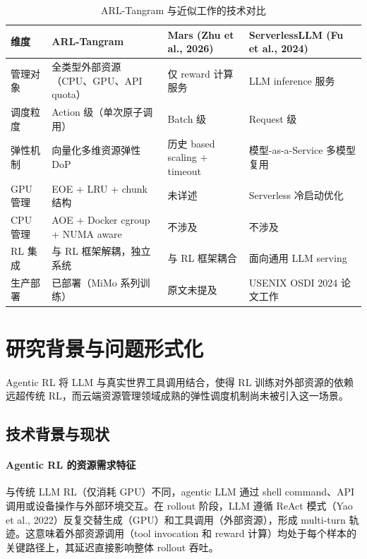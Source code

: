 \documentclass[11pt, a4paper]{article}
\begin{document}
\begin{table}[htbp]
\centering
\caption{ARL-Tangram 与近似工作的技术对比}
\label{tab:comparison}
\begin{tabular}{p{2.8cm}p{3.2cm}p{3.2cm}p{3.2cm}}
\toprule
\textbf{维度} & \textbf{ARL-Tangram} & \textbf{Mars (Zhu et al., 2026)} & \textbf{ServerlessLLM (Fu et al., 2024)} \\
\midrule
管理对象 & 全类型外部资源（CPU、GPU、API quota） & 仅 reward 计算服务 & LLM inference 服务 \\
调度粒度 & Action 级（单次原子调用） & Batch 级 & Request 级 \\
弹性机制 & 向量化多维资源弹性 DoP & 历史 based scaling + timeout & 模型-as-a-Service 多模型复用 \\
GPU 管理 & EOE + LRU + chunk 结构 & 未详述 & Serverless 冷启动优化 \\
CPU 管理 & AOE + Docker cgroup + NUMA aware & 不涉及 & 不涉及 \\
RL 集成 & 与 RL 框架解耦，独立系统 & 与 RL 框架耦合 & 面向通用 LLM serving \\
生产部署 & 已部署（MiMo 系列训练） & 原文未提及 & USENIX OSDI 2024 论文工作 \\
\bottomrule
\end{tabular}
\end{table}

\section{研究背景与问题形式化}

\begin{keyinsight}[TL;DR]
Agentic RL 将 LLM 与真实世界工具调用结合，使得 RL 训练对外部资源的依赖远超传统 RL，而云端资源管理领域成熟的弹性调度机制尚未被引入这一场景。
\end{keyinsight}

\subsection{技术背景与现状}

\paragraph{Agentic RL 的资源需求特征}
与传统 LLM RL（仅消耗 GPU）不同，agentic LLM 通过 shell command、API 调用或设备操作与外部环境交互。在 rollout 阶段，LLM 遵循 ReAct 模式（Yao et al., 2022）反复交替生成（GPU）和工具调用（外部资源），形成 multi-turn 轨迹。这意味着外部资源调用（tool invocation 和 reward 计算）均处于每个样本的关键路径上，其延迟直接影响整体 rollout 吞吐。
\end{document}
